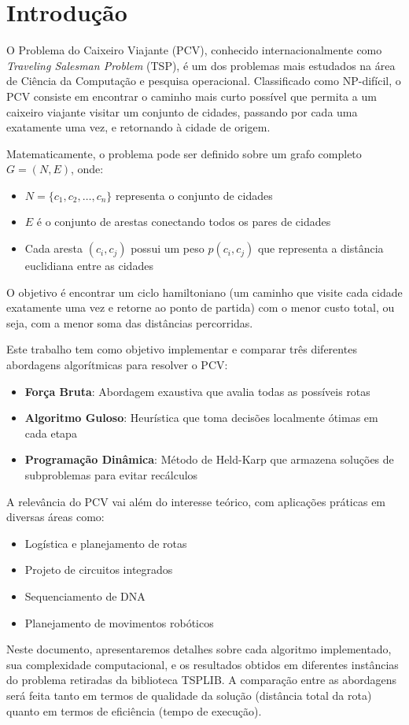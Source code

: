\section{Introdução}

O Problema do Caixeiro Viajante (PCV), conhecido internacionalmente como \textit{Traveling Salesman Problem} (TSP), é um dos problemas mais estudados na área de Ciência da Computação e pesquisa operacional. Classificado como NP-difícil, o PCV consiste em encontrar o caminho mais curto possível que permita a um caixeiro viajante visitar um conjunto de cidades, passando por cada uma exatamente uma vez, e retornando à cidade de origem.

Matematicamente, o problema pode ser definido sobre um grafo completo $G = (N, E)$, onde:
\begin{itemize}
    \item $N = \{c_1, c_2, \ldots, c_n\}$ representa o conjunto de cidades
    \item $E$ é o conjunto de arestas conectando todos os pares de cidades
    \item Cada aresta $(c_i, c_j)$ possui um peso $p(c_i, c_j)$ que representa a distância euclidiana entre as cidades
\end{itemize}

O objetivo é encontrar um ciclo hamiltoniano (um caminho que visite cada cidade exatamente uma vez e retorne ao ponto de partida) com o menor custo total, ou seja, com a menor soma das distâncias percorridas.

Este trabalho tem como objetivo implementar e comparar três diferentes abordagens algorítmicas para resolver o PCV:
\begin{itemize}
    \item \textbf{Força Bruta}: Abordagem exaustiva que avalia todas as possíveis rotas
    \item \textbf{Algoritmo Guloso}: Heurística que toma decisões localmente ótimas em cada etapa
    \item \textbf{Programação Dinâmica}: Método de Held-Karp que armazena soluções de subproblemas para evitar recálculos
\end{itemize}

A relevância do PCV vai além do interesse teórico, com aplicações práticas em diversas áreas como:
\begin{itemize}
    \item Logística e planejamento de rotas
    \item Projeto de circuitos integrados
    \item Sequenciamento de DNA
    \item Planejamento de movimentos robóticos
\end{itemize}

Neste documento, apresentaremos detalhes sobre cada algoritmo implementado, sua complexidade computacional, e os resultados obtidos em diferentes instâncias do problema retiradas da biblioteca TSPLIB. A comparação entre as abordagens será feita tanto em termos de qualidade da solução (distância total da rota) quanto em termos de eficiência (tempo de execução).